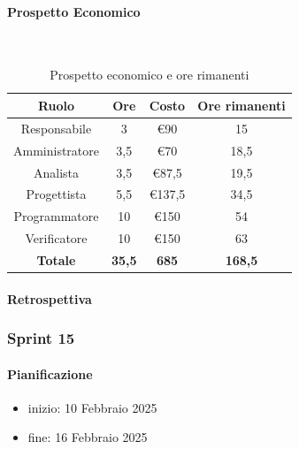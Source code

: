 \documentclass{article}
\begin{document}
                \paragraph{Prospetto Economico}\mbox{}\\
                \begin{table}[H]
                    \centering
                    \begin{tabular}{|c|c|c|c|}
                    \hline
                    \textbf{Ruolo}  & \textbf{Ore}  & \textbf{Costo} & \textbf{Ore rimanenti} \\ \hline
                    Responsabile    & 3             & €90            & 15                     \\ \hline
                    Amministratore  & 3,5           & €70            & 18,5                   \\ \hline
                    Analista        & 3,5           & €87,5          & 19,5                   \\ \hline
                    Progettista     & 5,5           & €137,5         & 34,5                   \\ \hline
                    Programmatore   & 10            & €150           & 54                     \\ \hline
                    Verificatore    & 10            & €150           & 63                     \\ \hline
                    \textbf{Totale} & \textbf{35,5} & \textbf{685}   & \textbf{168,5}         \\ \hline
                    \end{tabular}
                    \caption{Prospetto economico e ore rimanenti}
                \end{table}

                \paragraph{Retrospettiva}
            \subsubsection{Sprint 15}
                \paragraph{Pianificazione}
                \begin{itemize}
                    \item inizio: 10 Febbraio 2025
                    \item fine: 16 Febbraio 2025
                \end{itemize}
\end{document}

